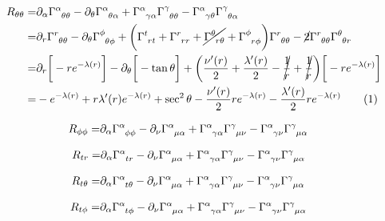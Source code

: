 \documentclass[]{article}
\newcommand\numberthis{\addtocounter{equation}{1}\tag{\theequation}}
\begin{document}
\begin{align*}
	R_{\theta\theta} =& \partial_\alpha \Gamma\indices{^\alpha_{\theta\theta}} - \partial_\theta \Gamma\indices{^\alpha_{\theta\alpha}} + \Gamma\indices{^\alpha_{\gamma\alpha}} \Gamma\indices{^\gamma_{\theta\theta}} - \Gamma\indices{^\alpha_{\gamma\theta}} \Gamma\indices{^\gamma_{\theta\alpha}}\\
	=& \partial_r \Gamma\indices{^r_{\theta\theta}} - \partial_\theta \Gamma\indices{^\phi_{\theta\phi}} + \bigg(\Gamma\indices{^t_{rt}}+\Gamma\indices{^r_{rr}}+\cancel{\Gamma\indices{^\theta_{r\theta}}}+\Gamma\indices{^\phi_{r\phi}}\bigg) \Gamma\indices{^r_{\theta\theta}} - \cancel{2}\Gamma\indices{^r_{\theta\theta}} \Gamma\indices{^\theta_{\theta r}}\\
	=& \partial_r \bigg[-r  e^{-\lambda(r)}\bigg] - \partial_\theta \bigg[-\tan \theta\bigg]  + \bigg(\frac{\nu^\prime(r)}{2}+\frac{\lambda^\prime(r)}{2}-\cancel{\frac{1}{r}}+\cancel{\frac{1}{r}}\bigg)\bigg[ -r  e^{-\lambda(r)}\bigg]\\
	=& -  e^{-\lambda(r)} + r \lambda^\prime(r) e^{-\lambda(r)} + \sec^2 \theta -\frac{\nu^\prime(r)}{2}r  e^{-\lambda(r)}-\frac{\lambda^\prime(r)}{2}r  e^{-\lambda(r)} \numberthis \label{eq:RtHtH}
\end{align*}

\begin{align*}
	R_{\phi\phi} =& \partial_\alpha \Gamma\indices{^\alpha_{\phi\phi}} - \partial_\nu \Gamma\indices{^\alpha_{\mu\alpha}} + \Gamma\indices{^\alpha_{\gamma\alpha}} \Gamma\indices{^\gamma_{\mu\nu}} - \Gamma\indices{^\alpha_{\gamma\nu}} \Gamma\indices{^\gamma_{\mu\alpha}}
\end{align*}

\begin{align*}
	R_{tr} =& \partial_\alpha \Gamma\indices{^\alpha_{tr}} - \partial_\nu \Gamma\indices{^\alpha_{\mu\alpha}} + \Gamma\indices{^\alpha_{\gamma\alpha}} \Gamma\indices{^\gamma_{\mu\nu}} - \Gamma\indices{^\alpha_{\gamma\nu}} \Gamma\indices{^\gamma_{\mu\alpha}}
\end{align*}

\begin{align*}
	R_{t\theta} =& \partial_\alpha \Gamma\indices{^\alpha_{t\theta}} - \partial_\nu \Gamma\indices{^\alpha_{\mu\alpha}} + \Gamma\indices{^\alpha_{\gamma\alpha}} \Gamma\indices{^\gamma_{\mu\nu}} - \Gamma\indices{^\alpha_{\gamma\nu}} \Gamma\indices{^\gamma_{\mu\alpha}}
\end{align*}

\begin{align*}
	R_{t\phi} =& \partial_\alpha \Gamma\indices{^\alpha_{t\phi}} - \partial_\nu \Gamma\indices{^\alpha_{\mu\alpha}} + \Gamma\indices{^\alpha_{\gamma\alpha}} \Gamma\indices{^\gamma_{\mu\nu}} - \Gamma\indices{^\alpha_{\gamma\nu}} \Gamma\indices{^\gamma_{\mu\alpha}}
\end{align*}
\end{document}
